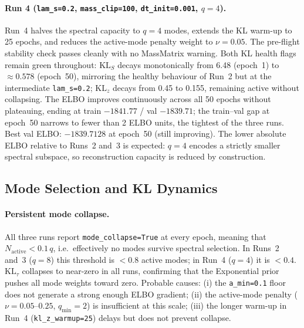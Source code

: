 \documentclass[11pt,a4paper]{article}
\begin{document}
\paragraph{Run 4 (\texttt{lam\_s=0.2}, \texttt{mass\_clip=100},
  \texttt{dt\_init=0.001}, $q=4$).}
Run~4 halves the spectral capacity to $q=4$ modes, extends the KL warm-up to
25 epochs, and reduces the active-mode penalty weight to $\nu=0.05$.
The pre-flight stability check passes cleanly with no MassMatrix warning.
Both KL health flags remain green throughout: $\mathrm{KL}_S$ decays
monotonically from 6.48 (epoch~1) to ${\approx}0.578$ (epoch~50), mirroring
the healthy behaviour of Run~2 but at the intermediate \texttt{lam\_s=0.2};
$\mathrm{KL}_z$ decays from 0.45 to 0.155, remaining active without
collapsing.
The ELBO improves continuously across all 50 epochs without plateauing, ending
at train $-1841.77$ / val $-1839.71$; the train--val gap at epoch~50 narrows
to fewer than 2 ELBO units, the tightest of the three runs.
Best val ELBO: $\mathbf{-1839.7128}$ at epoch~50 (still improving).
The lower absolute ELBO relative to Runs~2 and~3 is expected: $q=4$ encodes a
strictly smaller spectral subspace, so reconstruction capacity is reduced by
construction.

\subsection{Mode Selection and KL Dynamics}
\label{sec:experiments:modes}

\paragraph{Persistent mode collapse.}
All three runs report \texttt{mode\_collapse=True} at every epoch, meaning that
$N_{\text{active}} < 0.1\,q$, i.e.\ effectively no modes survive spectral
selection.
In Runs~2 and~3 ($q=8$) this threshold is $<0.8$ active modes; in Run~4
($q=4$) it is $<0.4$.
$\mathrm{KL}_\tau$ collapses to near-zero in all runs, confirming that the
Exponential prior pushes all mode weights toward zero.
Probable causes: (i) the \texttt{a\_min=0.1} floor does not generate a strong
enough ELBO gradient; (ii) the active-mode penalty ($\nu=0.05$--$0.25$,
$q_{\min}=2$) is insufficient at this scale; (iii) the longer warm-up in
Run~4 (\texttt{kl\_z\_warmup=25}) delays but does not prevent collapse.
\end{document}
